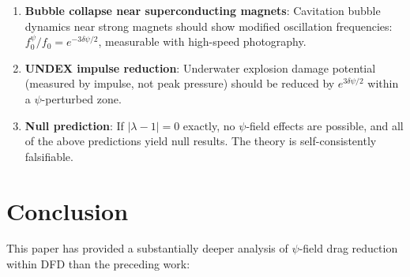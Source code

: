 \documentclass[12pt,twocolumn]{article}
\newcommand{\dpsi}{\delta\psi}
\begin{document}
\begin{enumerate}
\item \textbf{Bubble collapse near superconducting magnets}: Cavitation
  bubble dynamics near strong magnets should show modified oscillation
  frequencies: $f_0^\psi/f_0 = e^{-3\dpsi/2}$, measurable with high-speed
  photography.

\item \textbf{UNDEX impulse reduction}: Underwater explosion damage
  potential (measured by impulse, not peak pressure) should be reduced
  by $e^{3\dpsi/2}$ within a $\psi$-perturbed zone.

\item \textbf{Null prediction}: If $|\lambda - 1| = 0$ exactly, no
  $\psi$-field effects are possible, and all of the above predictions
  yield null results. The theory is self-consistently falsifiable.
\end{enumerate}

\section{Conclusion}
\label{sec:conclusion}

This paper has provided a substantially deeper analysis of $\psi$-field
drag reduction within DFD than the preceding work:
\end{document}
